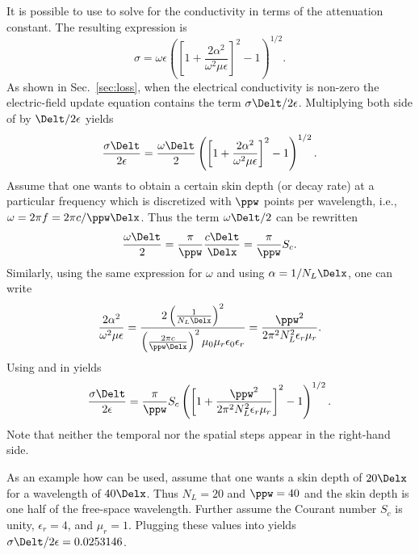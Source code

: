 It is possible to use  to solve for the conductivity
in terms of the attenuation constant.  The resulting expression is
\begin{equation}
  \sigma = \omega\epsilon
    \left(\left[1+\frac{2\alpha^2}{\omega^2\mu\epsilon}\right]^2
          - 1\right)^{1/2}.
  \label{eq:sigmaAlpha}
\end{equation}
As shown in Sec.\ \ref{sec:loss}, when the electrical conductivity is
non-zero the electric-field update equation contains the term
$\sigma\Delt/2\epsilon$.  Multiplying both side of
 by $\Delt/2\epsilon$ yields
\begin{equation}
  \frac{\sigma\Delt}{2\epsilon} = \frac{\omega\Delt}{2}
    \left(\left[1+\frac{2\alpha^2}{\omega^2\mu\epsilon}\right]^2
          - 1\right)^{1/2}.
  \label{eq:lossCoef}
\end{equation}
Assume that one wants to obtain a certain skin depth (or decay rate)
at a particular frequency which is discretized with $\ppw$ points per
wavelength, i.e., $\omega=2\pi f=2\pi c/\ppw \Delx$.  Thus the term
$\omega\Delt/2$ can be rewritten
\begin{equation}
  \frac{\omega\Delt}{2} = \frac{\pi}{\ppw}\frac{c\Delt}{\Delx}
                        = \frac{\pi}{\ppw}S_c.
  \label{eq:lossTerm}
\end{equation}
Similarly, using the same expression for $\omega$ and using
$\alpha=1/N_L\Delx$, one can write
\begin{equation}
  \frac{2\alpha^2}{\omega^2\mu\epsilon} =
   \frac{2 \left(\frac{1}{N_L\Delx}\right)^2}
        {\left(\frac{2\pi c}{\ppw \Delx}\right)^2
         \mu_0\mu_r\epsilon_0\epsilon_r} = 
   \frac{\ppw^2}{2 \pi^2 N_L^2 \epsilon_r\mu_r}.
  \label{eq:lossTermI}
\end{equation}
Using  and  in 
 yields
\begin{equation}
  \frac{\sigma\Delt}{2\epsilon} = 
    \frac{\pi}{\ppw}S_c
    \left(\left[1+\frac{\ppw^2}{2 \pi^2 N_L^2 \epsilon_r\mu_r}\right]^2
          - 1\right)^{1/2}.
  \label{eq:lossCoefI}
\end{equation}
Note that neither the temporal nor the spatial steps appear in the
right-hand side.

As an example how  can be used, assume that one
wants a skin depth of $20 \Delx$ for a wavelength of $40\Delx$. Thus
$N_L=20$ and $\ppw=40$ and the skin depth is one half of the
free-space wavelength.  Further assume the Courant number $S_c$ is
unity, $\epsilon_r=4$, and $\mu_r=1$.  Plugging these values into
 yields $\sigma\Delt/2\epsilon=0.0253146$.

